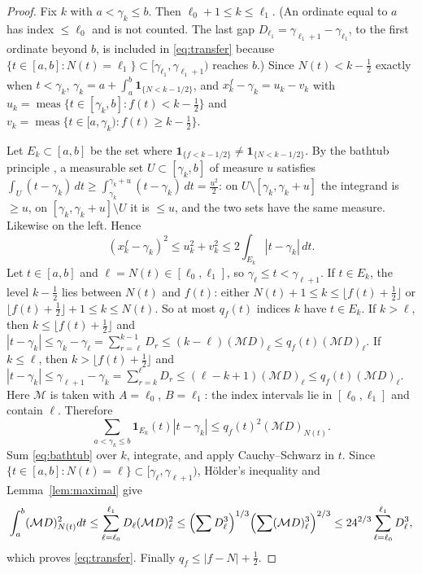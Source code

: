 \documentclass[11pt,a4paper]{article}
\makeatletter
\numberwithin{equation}{section}
\DeclareRobustCommand{\CGref}[1]{\ref{#1}}
\DeclareRobustCommand{\CGeqref}[1]{\eqref{#1}}
\DeclareRobustCommand{\CGcite}[2][]{\if\relax\detokenize{#1}\relax\cite{#2}\else\cite[#1]{#2}\fi}
\let\CG@origref\ref
\let\CG@origeqref\eqref
\newcommand{\CG@gettip}[1]{\@ifundefined{CGTip@#1}{#1}{\csname CGTip@#1\endcsname}}
\newcommand{\CG@getbib}[1]{\@ifundefined{CGBib@#1}{#1}{\csname CGBib@#1\endcsname}}
\DeclareRobustCommand{\CGref}[1]{\pdftooltip{\CG@origref{#1}}{\CG@gettip{#1}}}
\DeclareRobustCommand{\CGeqref}[1]{\pdftooltip{\CG@origeqref{#1}}{\CG@gettip{#1}}}
\DeclareRobustCommand{\CGcite}[2][]{\pdftooltip{\if\relax\detokenize{#1}\relax\cite{#2}\else\cite[#1]{#2}\fi}{\CG@getbib{#2}}}
\theoremstyle{definition}
\theoremstyle{remark}
\newcommand{\M}{\mathcal M}
\newcommand{\Ind}{\mathbf 1}
\newcommand{\meas}{\operatorname{meas}}
\makeatother
\begin{document}
\begin{proof}
Fix $k$ with $a<\gamma_k\le b$. Then $\ell_0+1\le k\le\ell_1$. (An ordinate equal to $a$ has index $\le\ell_0$ and is not counted. The last gap $D_{\ell_1}=\gamma_{\ell_1+1}-\gamma_{\ell_1}$, to the first ordinate beyond $b$, is included in \CGeqref{eq:transfer} because $\{t\in[a,b]:N(t)=\ell_1\}\subset[\gamma_{\ell_1},\gamma_{\ell_1+1})$ reaches $b$.) Since $N(t)<k-\frac12$ exactly when $t<\gamma_k$, $\gamma_k=a+\int_a^b\Ind_{\{N<k-1/2\}}$, and $x^f_k-\gamma_k=u_k-v_k$ with $u_k=\meas\{t\in[\gamma_k,b]:f(t)<k-\frac12\}$ and $v_k=\meas\{t\in[a,\gamma_k):f(t)\ge k-\frac12\}$.

Let $E_k\subset[a,b]$ be the set where $\Ind_{\{f<k-1/2\}}\ne\Ind_{\{N<k-1/2\}}$. By the bathtub principle \CGcite[Thm.~1.14]{LiebLoss2001}, a measurable set $U\subset[\gamma_k,b]$ of measure $u$ satisfies $\int_U(t-\gamma_k)\,dt\ge\int_{\gamma_k}^{\gamma_k+u}(t-\gamma_k)\,dt=\frac{u^2}2$: on $U\setminus[\gamma_k,\gamma_k+u]$ the integrand is $\ge u$, on $[\gamma_k,\gamma_k+u]\setminus U$ it is $\le u$, and the two sets have the same measure. Likewise on the left. Hence
\begin{equation}
(x^f_k-\gamma_k)^2\le u_k^2+v_k^2\le2\int_{E_k}|t-\gamma_k|\,dt .
\label{eq:bathtub}
\end{equation}
Let $t\in[a,b]$ and $\ell=N(t)\in[\ell_0,\ell_1]$, so $\gamma_\ell\le t<\gamma_{\ell+1}$. If $t\in E_k$, the level $k-\frac12$ lies between $N(t)$ and $f(t)$: either $N(t)+1\le k\le\lfloor f(t)+\frac12\rfloor$ or $\lfloor f(t)+\frac12\rfloor+1\le k\le N(t)$. So at most $q_f(t)$ indices $k$ have $t\in E_k$. If $k>\ell$, then $k\le\lfloor f(t)+\frac12\rfloor$ and $|t-\gamma_k|\le\gamma_k-\gamma_\ell=\sum_{r=\ell}^{k-1}D_r\le(k-\ell)(\M D)_\ell\le q_f(t)(\M D)_\ell$. If $k\le\ell$, then $k>\lfloor f(t)+\frac12\rfloor$ and $|t-\gamma_k|\le\gamma_{\ell+1}-\gamma_k=\sum_{r=k}^{\ell}D_r\le(\ell-k+1)(\M D)_\ell\le q_f(t)(\M D)_\ell$. Here $\M$ is taken with $A=\ell_0$, $B=\ell_1$: the index intervals lie in $[\ell_0,\ell_1]$ and contain $\ell$. Therefore
\begin{equation}
\sum_{a<\gamma_k\le b}\Ind_{E_k}(t)|t-\gamma_k|\le q_f(t)^2(\M D)_{N(t)} .
\label{eq:disp_22}
\end{equation}
Sum \CGeqref{eq:bathtub} over $k$, integrate, and apply Cauchy--Schwarz in $t$. Since $\{t\in[a,b]:N(t)=\ell\}\subset[\gamma_\ell,\gamma_{\ell+1})$, H\"older's inequality and Lemma~\CGref{lem:maximal} give
\begin{equation}
\int_a^b(\M D)_{N(t)}^2dt\le\sum_{\ell=\ell_0}^{\ell_1}D_\ell(\M D)_\ell^2\le\Bigl(\sum D_\ell^3\Bigr)^{1/3}\Bigl(\sum(\M D)_\ell^3\Bigr)^{2/3}\le24^{2/3}\sum_{\ell=\ell_0}^{\ell_1}D_\ell^3 ,
\label{eq:disp_23}
\end{equation}
which proves \CGeqref{eq:transfer}. Finally $q_f\le|f-N|+\frac12$.
\end{proof}
\end{document}
